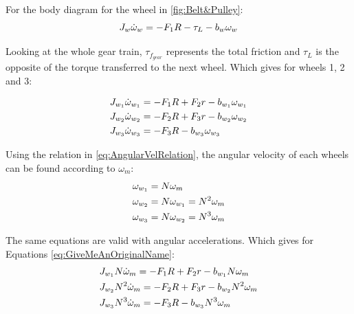 For the body diagram for the wheel in \autoref{fig:Belt&Pulley}:
\begin{equation}
	J_w\dot{\omega}_w = -F_1R -\tau_L -b_w\omega_w \addunit{\newton\meter}
\end{equation}

Looking at the whole gear train, $\tau_{f_{gear}}$ represents the total friction and $\tau_L$ is the opposite of the torque transferred to the next wheel. Which gives for wheels 1, 2 and 3:

\begin{subequations} 
	\begin{flalign} \label{eq:GiveMeAnOriginalName}
		&J_{w_1}\dot{\omega}_{w_1} = -F_1R + F_2r -b_{w_1}\omega_{w_1} \addunit{\newton\meter}\\ 
		&J_{w_2}\dot{\omega}_{w_2} = -F_2R + F_3r -b_{w_2}\omega_{w_2} \addunit{\newton\meter}\\ 
		&J_{w_3}\dot{\omega}_{w_3} = -F_3R - b_{w_3}\omega_{w_3} \addunit{\newton\meter}
	\end{flalign}
\end{subequations}

Using the relation in \autoref{eq:AngularVelRelation}, the angular velocity of each wheels can be found according to $\omega_m$:
\begin{subequations} 
	\begin{flalign}
		&\omega_{w_1} = N \omega_m \addunit{\radian\per\second}\\
		&\omega_{w_2} = N \omega_{w_1} = N^2 \omega_m \addunit{\radian\per\second}\\
		&\omega_{w_3} = N \omega_{w_2} = N^3 \omega_m \addunit{\radian\per\second}
	\end{flalign}
\end{subequations}

The same equations are valid with angular accelerations.
Which gives for Equations \ref{eq:GiveMeAnOriginalName}:
\begin{subequations} 
	\begin{flalign}  
		&J_{w_1}N\dot{\omega}_m = -F_1R + F_2r -b_{w_1}N\omega_m \addunit{\newton\meter}\\ 
		&J_{w_2}N^2\dot{\omega}_m = -F_2R + F_3r -b_{w_2}N^2\omega_m  \addunit{\newton\meter}\\ 
		&J_{w_3}N^3\dot{\omega}_m = -F_3R - b_{w_3}N^3\omega_m  \addunit{\newton\meter}
	\end{flalign}
\end{subequations}

